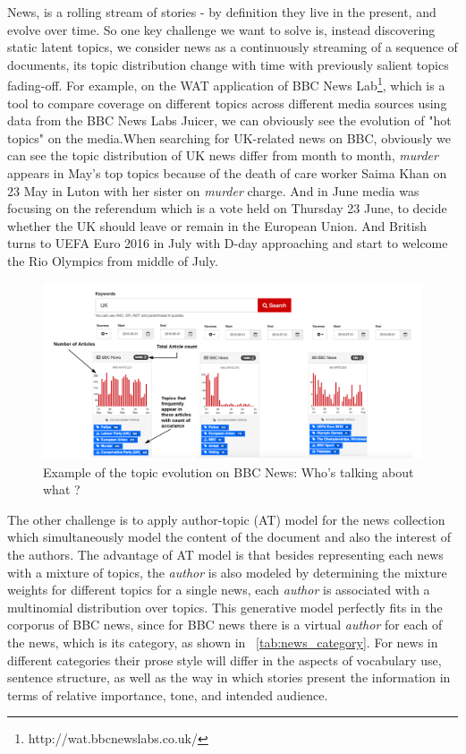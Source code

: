 News, is a rolling stream of stories - by definition they live in the present, and evolve over time. So one key challenge we want to solve is, instead discovering static latent topics, we consider news as a continuously streaming of a sequence of documents, its topic distribution change with time with previously salient topics fading-off. For example, on the WAT application of BBC News Lab\footnote{http://wat.bbcnewslabs.co.uk/}, which is a tool to compare coverage on different topics across different media sources using data from the BBC News Labs Juicer, we can obviously see the evolution of "hot topics" on the media.When searching for UK-related news on BBC, obviously we can see the topic distribution of UK news differ from month to month, \textit{murder} appears in May's top topics because of the death of care worker Saima Khan on 23 May in Luton with her sister on \textit{murder} charge. And in June media was focusing on the referendum which is a vote held on Thursday 23 June, to decide whether the UK should leave or remain in the European Union. And British turns to UEFA Euro 2016 in July with D-day approaching and start to welcome the Rio Olympics from middle of July.
\begin{figure}[h]
\centering
\includegraphics[width=\textwidth]{figures/BBC_wat.png}
\caption{Example of the topic evolution on BBC News: Who's talking about what ?}
\label{fig:bbc_wat}
\end{figure}

The other challenge is to apply author-topic (AT) model for the news collection which simultaneously model the content of the document and also the interest of the authors. The advantage of AT model is that besides representing each news with a mixture of topics, the \textit{author} is also modeled by determining the mixture weights for different topics for a single news, each \textit{author} is associated with a multinomial distribution over topics. This generative model perfectly fits in the corporus of BBC news, since for BBC news there is a virtual \textit{author} for each of the news, which is its category, as shown in ~\ref{tab:news_category}. For news in different categories their prose style will differ in the aspects of vocabulary use,  sentence structure, as well as the way in which stories present the information in terms of relative importance, tone, and intended audience. 


